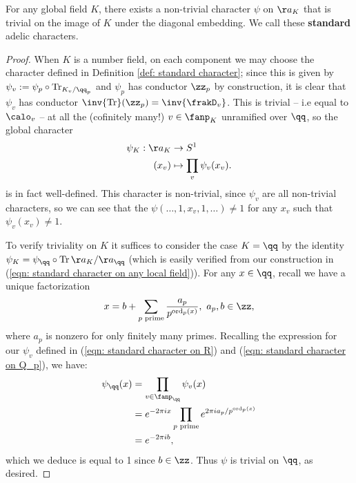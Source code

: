 \documentclass[11pt, x11names, openany]{book}
\begin{document}
\begin{prop}
    \label{prop: exists non-trivial adelic character}
For any global field $K$, there exists a non-trivial character $\psi$ on $\aa_K$ that is trivial on the image of $K$ under the diagonal embedding. We call these \textbf{standard} adelic characters.
\end{prop}
\begin{proof}
When $K$ is a number field, on each component we may choose the character defined in Definition \ref{def: standard character}; since this is given by $\psi_v := \psi_p \circ \tr_{K_v/\qq_p}$ and $\psi_p$ has conductor $\zz_p$ by construction, it is clear that $\psi_v$ has conductor $\inv{\tr}(\zz_p) = \inv{\frakD_v}$. This is trivial -- i.e equal to $\calo_v$ -- at all the (cofinitely many!) $v \in \fanp_K$ unramified over $\qq$, so the global character
\begin{align*}
    \psi_K: \aa_K &\to S^1\\
    (x_v) & \mapsto \prod_v \psi_v(x_v).
\end{align*}
is in fact well-defined. This character is non-trivial, since $\psi_v$ are all non-trivial characters, so we can see that the $\psi(\ldots, 1, x_v, 1, \ldots) \neq 1$ for any $x_v$ such that $\psi_v(x_v) \neq 1$.

To verify triviality on $K$ it suffices to consider the case $K = \qq$ by the identity $\psi_K = \psi_\qq \circ \tr{\aa_K/\aa_\qq}$ (which is easily verified from our construction in (\ref{eqn: standard character on any local field})). For any $x \in \qq$, recall we have a unique factorization
\begin{equation*}
    x = b + \sum_{p \text{ prime}} \frac{a_p}{p^{\ord_p(x)}}, \ a_p, b \in \zz,
\end{equation*}
where $a_p$ is nonzero for only finitely many primes. Recalling the expression for our $\psi_v$ defined in (\ref{eqn: standard character on R}) and (\ref{eqn: standard character on Q_p}), we have:
\begin{align*}
    \psi_\qq(x) &= \prod_{v \in \fanp_\qq} \psi_v(x)\\
    &= e^{- 2 \pi i x} \prod_{p \text{ prime}} e^{2 \pi i a_p/p^{\ord_p(x)}}\\
    &= e^{- 2 \pi i b},
\end{align*}
which we deduce is equal to 1 since $b \in \zz$. Thus $\psi$ is trivial on $\qq$, as desired.


\end{proof}
\end{document}
